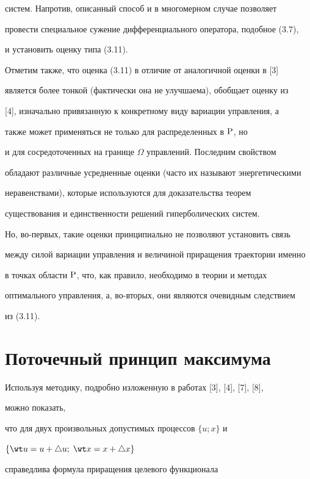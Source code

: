 систем. Напротив, описанный способ и в многомерном случае позволяет


провести специальное сужение дифференциального оператора, подобное (3.7),


и установить оценку типа (3.11).





Отметим также, что оценка (3.11) в отличие от аналогичной оценки в [3]


является более тонкой (фактически она не улучшаема), обобщает оценку из


[4], изначально привязанную к конкретному виду вариации управления, а


также может применяться не только для распределенных в $\P$, но


и для сосредоточенных на границе $\Omega$ управлений. Последним свойством


обладают различные усредненные оценки (часто их называют энергетическими


неравенствами), которые используются для доказательства теорем


существования и единственности решений гиперболических систем.


Но, во-первых, такие оценки принципиально не позволяют установить связь


между силой вариации управления и величиной приращения траектории именно


в точках области $\P$, что, как правило, необходимо в теории и методах


оптимального управления, а, во-вторых, они являются очевидным следствием


из (3.11).





\section{Поточечный принцип максимума}





Используя методику, подробно изложенную в работах [3], [4], [7], [8],


можно показать,


что для двух произвольных допустимых процессов $\{u;x\}$ и


$\{\wt u = u + \triangle u; \; \wt x = x + \triangle x \}$


справедлива формула приращения целевого функционала


